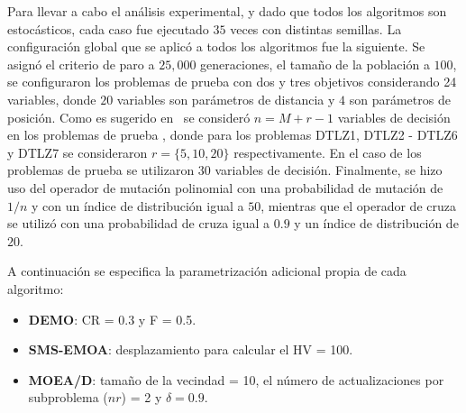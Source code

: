 Para llevar a cabo el análisis experimental, y dado que todos los algoritmos son estocásticos, cada caso fue ejecutado $35$ 
veces con distintas semillas.
%
La configuración global que se aplicó a todos los algoritmos fue la siguiente.
%
Se asignó el criterio de paro a $25,000$ generaciones, el tamaño de la población a $100$, 
se configuraron los problemas de prueba \WFG{} con dos y tres objetivos considerando 24 variables, 
donde $20$ variables son parámetros de distancia y $4$ son parámetros de posición.
%
Como es sugerido en~\cite{Joel:DTLZ_2} se consideró $n=M+r-1$ variables de decisión en los problemas de prueba \DTLZ{}, 
donde para los problemas DTLZ1, DTLZ2 - DTLZ6 y DTLZ7 se consideraron $r=\{5, 10, 20\}$  respectivamente.
% 
En el caso de los problemas de prueba \UF{} se utilizaron $30$ variables de decisión.
%
Finalmente, se hizo uso del operador de mutación polinomial con una probabilidad de mutación de $1/n$ y con un índice de distribución igual a $50$, 
mientras que el operador de cruza \SBX{} se utilizó con una probabilidad de cruza igual a $0.9$ y un índice de distribución de $20$.

A continuación se especifica la parametrización adicional propia de cada algoritmo:
\begin{itemize}
\item \textbf{DEMO}: CR = 0.3 y F = 0.5.
\item \textbf{SMS-EMOA}: desplazamiento para calcular el HV = 100.
\item \textbf{MOEA/D}: tamaño de la vecindad = 10, el número de actualizaciones por subproblema ($nr$) = 2 y $\delta = 0.9$.
\end{itemize}

